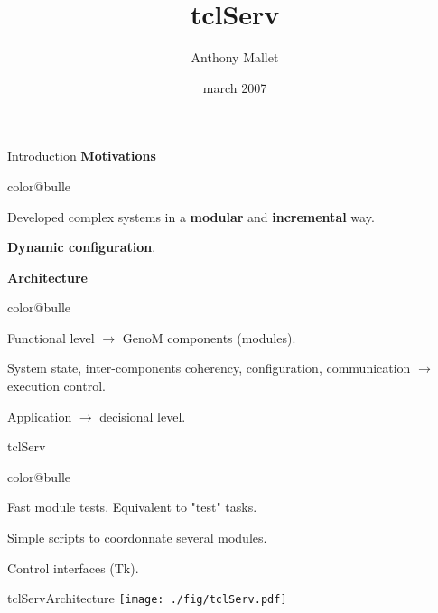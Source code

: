 \documentclass[a4paper,landscape,smooth]{show}
\title{\Huge tclServ}
\author{Anthony Mallet}
\date{march 2007}
\begin{document}
\maketitle

\def\figurepath{./:./fig}
\graphicspath{{./:./fig/}}


\begin{part}{Introduction}{}
   \vfill
   {\bf Motivations}
   \begin{bitemize}{color@bulle}
      \item Developed complex systems in a {\bf modular} and
	    {\bf incremental} way.
      \item {\bf Dynamic configuration}.
   \end{bitemize}
   \vfill
   {\bf Architecture}
   \begin{bitemize}{color@bulle}
      \item  Functional level $\rightarrow$ GenoM components (modules).
      \item System state,  inter-components coherency, configuration,
	    communication $\rightarrow$ execution control.
      \item Application $\rightarrow$ decisional level.
   \end{bitemize}
   \vfill
\end{part}

\begin{tslide}{tclServ}
   \vfill
   \begin{bitemize}{color@bulle}
      \item Fast module tests. Equivalent to
	    "test" tasks.
      \item Simple scripts to coordonnate several modules.
      \item Control interfaces (Tk).
   \end{bitemize}
   \vfill
\end{tslide}


\begin{part}{tclServ}{Architecture}
   \vfill
    \texttt{[image: ./fig/tclServ.pdf]}

   \vfill
\end{part}

\end{document}
